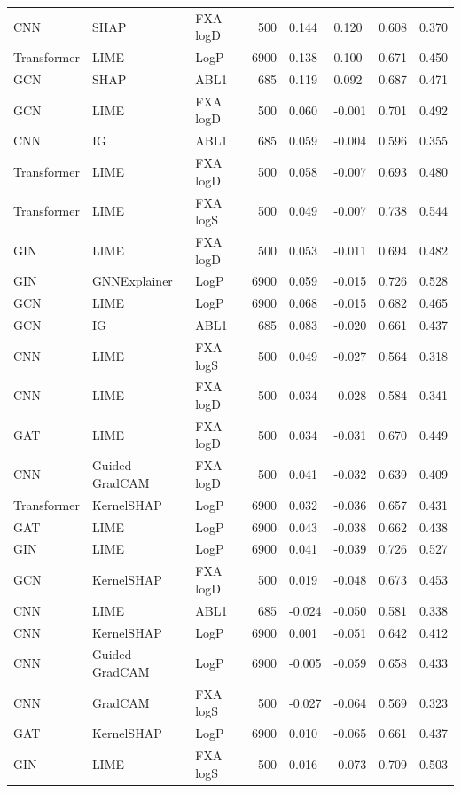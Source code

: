 \begin{table}
\begin{tabular}{lllrllll}
CNN & SHAP & FXA logD & 500 & 0.144 & 0.120 & 0.608 & 0.370 \\
Transformer & LIME & LogP & 6900 & 0.138 & 0.100 & 0.671 & 0.450 \\
GCN & SHAP & ABL1 & 685 & 0.119 & 0.092 & 0.687 & 0.471 \\
GCN & LIME & FXA logD & 500 & 0.060 & -0.001 & 0.701 & 0.492 \\
CNN & IG & ABL1 & 685 & 0.059 & -0.004 & 0.596 & 0.355 \\
Transformer & LIME & FXA logD & 500 & 0.058 & -0.007 & 0.693 & 0.480 \\
Transformer & LIME & FXA logS & 500 & 0.049 & -0.007 & 0.738 & 0.544 \\
GIN & LIME & FXA logD & 500 & 0.053 & -0.011 & 0.694 & 0.482 \\
GIN & GNNExplainer & LogP & 6900 & 0.059 & -0.015 & 0.726 & 0.528 \\
GCN & LIME & LogP & 6900 & 0.068 & -0.015 & 0.682 & 0.465 \\
GCN & IG & ABL1 & 685 & 0.083 & -0.020 & 0.661 & 0.437 \\
CNN & LIME & FXA logS & 500 & 0.049 & -0.027 & 0.564 & 0.318 \\
CNN & LIME & FXA logD & 500 & 0.034 & -0.028 & 0.584 & 0.341 \\
GAT & LIME & FXA logD & 500 & 0.034 & -0.031 & 0.670 & 0.449 \\
CNN & Guided GradCAM & FXA logD & 500 & 0.041 & -0.032 & 0.639 & 0.409 \\
Transformer & KernelSHAP & LogP & 6900 & 0.032 & -0.036 & 0.657 & 0.431 \\
GAT & LIME & LogP & 6900 & 0.043 & -0.038 & 0.662 & 0.438 \\
GIN & LIME & LogP & 6900 & 0.041 & -0.039 & 0.726 & 0.527 \\
GCN & KernelSHAP & FXA logD & 500 & 0.019 & -0.048 & 0.673 & 0.453 \\
CNN & LIME & ABL1 & 685 & -0.024 & -0.050 & 0.581 & 0.338 \\
CNN & KernelSHAP & LogP & 6900 & 0.001 & -0.051 & 0.642 & 0.412 \\
CNN & Guided GradCAM & LogP & 6900 & -0.005 & -0.059 & 0.658 & 0.433 \\
CNN & GradCAM & FXA logS & 500 & -0.027 & -0.064 & 0.569 & 0.323 \\
GAT & KernelSHAP & LogP & 6900 & 0.010 & -0.065 & 0.661 & 0.437 \\
GIN & LIME & FXA logS & 500 & 0.016 & -0.073 & 0.709 & 0.503 \\

\end{tabular}
\end{table}
